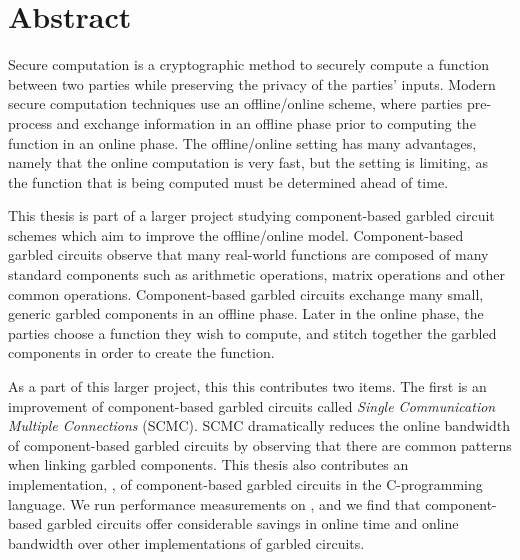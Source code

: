 
\chapter*{Abstract}

Secure computation is a cryptographic method to securely compute a function between two parties while preserving the privacy of the parties' inputs.
Modern secure computation techniques use an offline/online scheme, where parties pre-process and exchange information in an offline phase prior to computing the function in an online phase. 
The offline/online setting has many advantages, namely that the online computation is very fast, but the setting is limiting, as the function that is being computed must be determined ahead of time.

This thesis is part of a larger project studying component-based garbled circuit schemes which aim to improve the offline/online model.
Component-based garbled circuits observe that many real-world functions are composed of many standard components such as arithmetic operations, matrix operations and other common operations.
Component-based garbled circuits exchange many small, generic garbled components in an offline phase. 
Later in the online phase, the parties choose a function they wish to compute, and stitch together the garbled components in order to create the function.

As a part of this larger project, this this contributes two items.
The first is an improvement of component-based garbled circuits called \textit{Single Communication Multiple Connections} (SCMC).
SCMC dramatically reduces the online bandwidth of component-based garbled circuits by observing that there are common patterns when linking garbled components.
This thesis also contributes an implementation, \CompGC, of component-based garbled circuits in the C-programming language. 
We run performance measurements on \CompGC, and we find that component-based garbled circuits offer considerable savings in online time and online bandwidth over other implementations of garbled circuits. 
